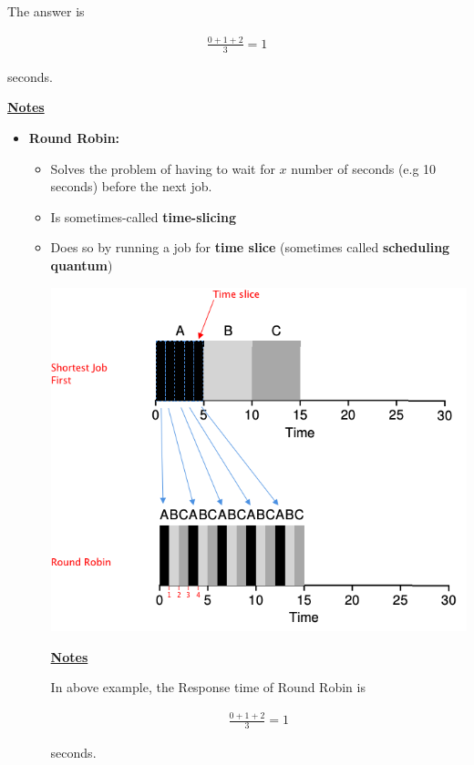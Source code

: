 \documentclass[12pt]{article}
\begin{document}
\begin{enumerate}[1.]
    \bigskip

    The answer is


    \begin{align}
        \frac{0 + 1 + 2}{3} = 1
    \end{align}

    seconds.

    \bigskip

    \underline{\textbf{Notes}}

    \begin{itemize}
        \item \textbf{Round Robin:}

        \begin{itemize}
            \item Solves the problem of having to wait for $x$ number of seconds (e.g 10 seconds)
            before the next job.
            \item Is sometimes-called \textbf{time-slicing}
            \item Does so by running a job for \textbf{time slice} (sometimes called \textbf{scheduling quantum})


            \begin{center}
            \includegraphics[width=0.8\linewidth]{images/worksheet_4_solution_4.png}
            \end{center}

            \bigskip

            \underline{\textbf{Notes}}

            \bigskip

            In above example, the Response time of Round Robin is

            \begin{align}
                \frac{0 + 1 + 2}{3} = 1
            \end{align}

            seconds.
        \end{itemize}
    \end{itemize}

\end{enumerate}
\end{document}
